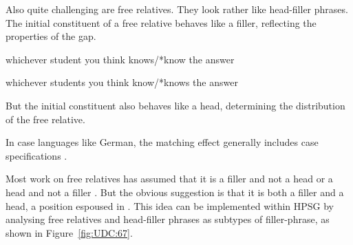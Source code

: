 \documentclass[output=paper
                ,modfonts
                ,nonflat
	        ,collection
	        ,collectionchapter
	        ,collectiontoclongg
 	        ,biblatex
                ,babelshorthands
                ,newtxmath
                ,draftmode
                ,colorlinks, citecolor=brown
]{./langsci/langscibook}
\begin{document}
{Also quite challenging are free relatives. They look rather like
head-filler phrases. The initial constituent of a free relative behaves
like a filler, reflecting the properties of the gap.

\begin{exe}
\ex \label{ex:UDC:63}
whichever student you think knows/*know the answer
\end{exe}

\begin{exe}
\ex \label{ex:UDC:64}
whichever students you think know/*knows the answer
\end{exe}

\noindent
But the initial constituent also behaves like a head, determining the
distribution of the free relative.

\begin{exe}
\ex \label{ex:UDC:65}
\begin{xlist}
  
\end{xlist}
\end{exe}


\begin{exe}
\ex \label{ex:UDC:66}
\begin{xlist}
\end{xlist}
\end{exe}

\noindent
In case languages like German, the matching effect generally includes case
specifications \citep{Mueller:99a}. %

Most work on free relatives has
assumed that it is a filler and not a head
\citep{Groos:Riemsdijk:81,Grosu:2003} or a head and not a filler
\citep{Bresnan:Grimshaw:78}. But the obvious suggestion is that it is
both a filler and a head, a position espoused in
\citet{Huddleston02}. This idea can be implemented within HPSG by
analysing free relatives and head-filler phrases as subtypes of
filler-phrase, as shown in Figure~\ref{fig:UDC:67}.


\begin{figure}[htb]
  \centering


\end{figure}}
\end{document}
